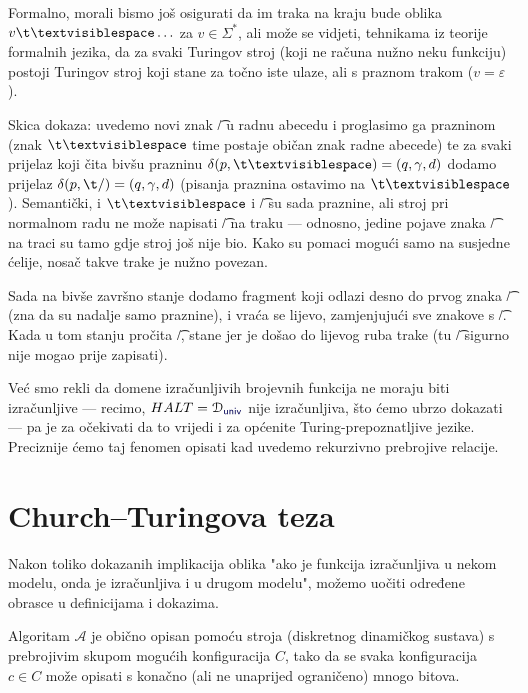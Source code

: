 \begin{napomena}[{name=[za problem zaustavljanja završno stanje trake nije bitno]}]\label{nap:re0}
Formalno, morali bismo još osigurati da im traka na kraju bude oblika $v\bl\ldots$ za $v\in\Sigma^*$, ali može se vidjeti, tehnikama iz teorije formalnih jezika, da za svaki Turingov stroj (koji ne računa nužno neku funkciju) postoji Turingov stroj koji stane za točno iste ulaze, ali s praznom trakom ($v=\varepsilon$).

Skica dokaza: uvedemo novi znak \t/ u radnu abecedu i proglasimo ga prazninom (znak $\bl$ time postaje običan znak radne abecede) te za svaki prijelaz koji čita bivšu prazninu $\delta(p,\bl)=(q,\gamma,d)$ dodamo prijelaz $\delta(p,\t/)=(q,\gamma,d)$ (pisanja praznina ostavimo na $\bl$). Semantički, i $\bl$ i \t/ su sada praznine, ali stroj pri normalnom radu ne može napisati \t/ na traku --- odnosno, jedine pojave znaka \t/ na traci su tamo gdje stroj još nije bio. Kako su pomaci mogući samo na susjedne ćelije, nosač takve trake je nužno povezan.

Sada na bivše završno stanje dodamo fragment koji odlazi desno do prvog znaka \t/ (zna da su nadalje samo praznine), i vraća se lijevo, zamjenjujući sve znakove s \t/. Kada u tom stanju pročita \t/, stane jer je došao do lijevog ruba trake (tu \t/ sigurno nije mogao prije zapisati).
\end{napomena}

Već smo rekli da domene izračunljivih brojevnih funkcija ne moraju biti izračunljive --- recimo, $HALT=\dom{\f{univ}}$ nije izračunljiva, što ćemo ubrzo dokazati --- pa je za očekivati da to vrijedi i za općenite Turing-prepoznatljive jezike. Preciznije ćemo taj fenomen opisati kad uvedemo rekurzivno prebrojive relacije.

\section{\texorpdfstring{Church--\!Turingova teza}{Church-Turingova teza}}
Nakon toliko dokazanih implikacija oblika "ako je funkcija izračunljiva u nekom modelu, onda je izračunljiva i u drugom modelu", možemo uočiti određene obrasce u definicijama i dokazima.


Algoritam $\mathcal A$ je obično opisan pomoću stroja (diskretnog dinamičkog sustava) s prebrojivim skupom mogućih konfiguracija $C$, tako da se svaka konfiguracija $c\in C$ može opisati s konačno (ali ne unaprijed ograničeno) mnogo bitova.

